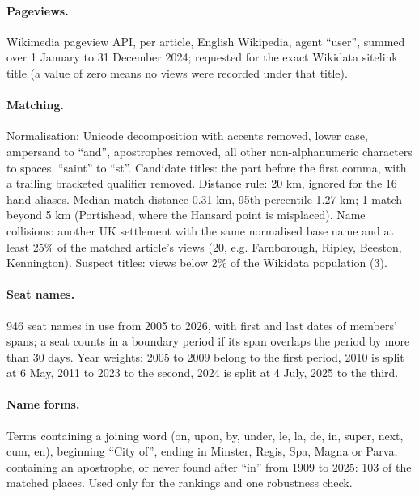 \documentclass[11pt,a4paper]{article}
\begin{document}
\paragraph{Pageviews.} Wikimedia pageview API, per article, English Wikipedia, agent ``user'', summed over 1 January to 31 December 2024; requested for the exact Wikidata sitelink title (a value of zero means no views were recorded under that title).
\paragraph{Matching.} Normalisation: Unicode decomposition with accents removed, lower case, ampersand to ``and'', apostrophes removed, all other non-alphanumeric characters to spaces, ``saint'' to ``st''. Candidate titles: the part before the first comma, with a trailing bracketed qualifier removed. Distance rule: 20 km, ignored for the 16 hand aliases. Median match distance 0.31 km, 95th percentile 1.27 km; 1 match beyond 5 km (Portishead, where the Hansard point is misplaced). Name collisions: another UK settlement with the same normalised base name and at least 25\% of the matched article's views (20, e.g. Farnborough, Ripley, Beeston, Kennington). Suspect titles: views below 2\% of the Wikidata population (3).
\paragraph{Seat names.} 946 seat names in use from 2005 to 2026, with first and last dates of members' spans; a seat counts in a boundary period if its span overlaps the period by more than 30 days. Year weights: 2005 to 2009 belong to the first period, 2010 is split at 6 May, 2011 to 2023 to the second, 2024 is split at 4 July, 2025 to the third.
\paragraph{Name forms.} Terms containing a joining word (on, upon, by, under, le, la, de, in, super, next, cum, en), beginning ``City of'', ending in Minster, Regis, Spa, Magna or Parva, containing an apostrophe, or never found after ``in'' from 1909 to 2025: 103 of the matched places. Used only for the rankings and one robustness check.
\end{document}
